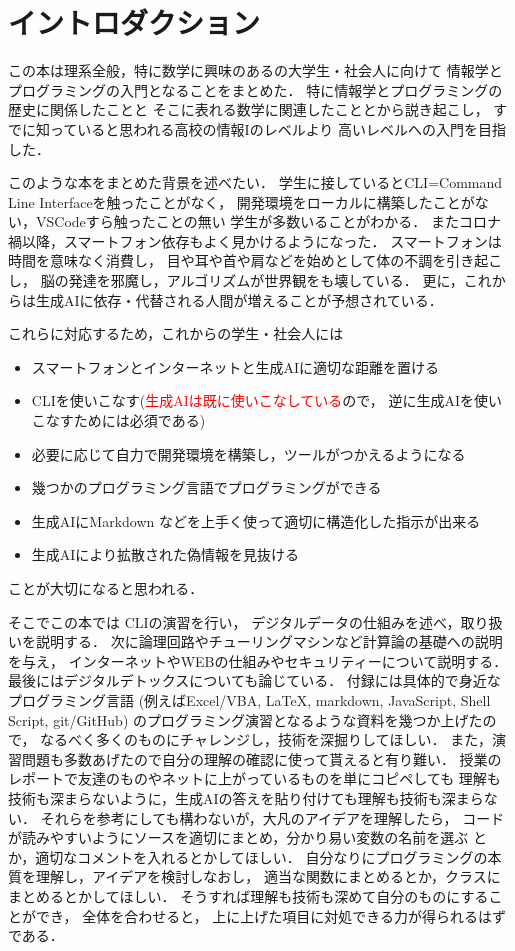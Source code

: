\chapter{イントロダクション}

この本は理系全般，特に数学に興味のあるの大学生・社会人に向けて
情報学とプログラミングの入門となることをまとめた．
特に情報学とプログラミングの歴史に関係したことと
そこに表れる数学に関連したこととから説き起こし，
すでに知っていると思われる高校の情報Iのレベルより
高いレベルへの入門を目指した．

このような本をまとめた背景を述べたい．
学生に接しているとCLI=Command Line Interfaceを触ったことがなく，
開発環境をローカルに構築したことがない，VSCodeすら触ったことの無い
学生が多数いることがわかる．
またコロナ禍以降，スマートフォン依存もよく見かけるようになった．
スマートフォンは時間を意味なく消費し，
目や耳や首や肩などを始めとして体の不調を引き起こし，
脳の発達を邪魔し，アルゴリズムが世界観をも壊している．
更に，これからは生成AIに依存・代替される人間が増えることが予想されている．

これらに対応するため，これからの学生・社会人には
\begin{itemize}
   \item
      スマートフォンとインターネットと生成AIに適切な距離を置ける
   \item
      CLIを使いこなす(\textcolor{red}{生成AIは既に使いこなしている}ので，
      逆に生成AIを使いこなすためには必須である)
   \item
      必要に応じて自力で開発環境を構築し，ツールがつかえるようになる
   \item
      幾つかのプログラミング言語でプログラミングができる
   \item
      生成AIにMarkdown などを上手く使って適切に構造化した指示が出来る
   \item
      生成AIにより拡散された偽情報を見抜ける
\end{itemize}
ことが大切になると思われる．

そこでこの本では
CLIの演習を行い，
デジタルデータの仕組みを述べ，取り扱いを説明する．
次に論理回路やチューリングマシンなど計算論の基礎への説明を与え，
インターネットやWEBの仕組みやセキュリティーについて説明する．
最後にはデジタルデトックスについても論じている．
付録には具体的で身近なプログラミング言語
(例えばExcel/VBA, \LaTeX, markdown, JavaScript, Shell Script, git/GitHub)
のプログラミング演習となるような資料を幾つか上げたので，
なるべく多くのものにチャレンジし，技術を深掘りしてほしい．
また，演習問題も多数あげたので自分の理解の確認に使って貰えると有り難い．
授業のレポートで友達のものやネットに上がっているものを単にコピペしても
理解も技術も深まらないように，生成AIの答えを貼り付けても理解も技術も深まらない．
それらを参考にしても構わないが，大凡のアイデアを理解したら，
コードが読みやすいようにソースを適切にまとめ，分かり易い変数の名前を選ぶ
とか，適切なコメントを入れるとかしてほしい．
自分なりにプログラミングの本質を理解し，アイデアを検討しなおし，
適当な関数にまとめるとか，クラスにまとめるとかしてほしい．
そうすれば理解も技術も深めて自分のものにすることができ，
全体を合わせると，
上に上げた項目に対処できる力が得られるはずである．

